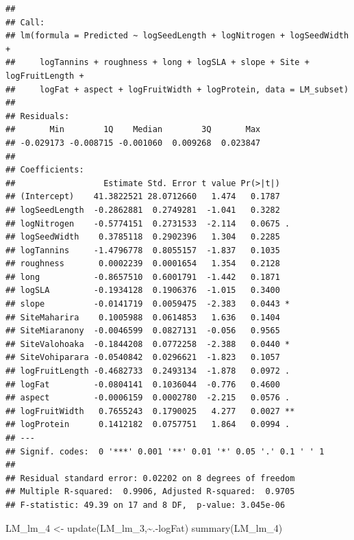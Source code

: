 \documentclass[
  12pt,
]{article}
\newenvironment{Shaded}{\begin{snugshade}}{\end{snugshade}}
\newcommand{\FunctionTok}[1]{\textcolor[rgb]{0.00,0.00,0.00}{#1}}
\newcommand{\NormalTok}[1]{#1}
\newcommand{\OtherTok}[1]{\textcolor[rgb]{0.56,0.35,0.01}{#1}}
\newcommand{\SpecialCharTok}[1]{\textcolor[rgb]{0.00,0.00,0.00}{#1}}
\begin{document}
\begin{verbatim}
## 
## Call:
## lm(formula = Predicted ~ logSeedLength + logNitrogen + logSeedWidth + 
##     logTannins + roughness + long + logSLA + slope + Site + logFruitLength + 
##     logFat + aspect + logFruitWidth + logProtein, data = LM_subset)
## 
## Residuals:
##       Min        1Q    Median        3Q       Max 
## -0.029173 -0.008715 -0.001060  0.009268  0.023847 
## 
## Coefficients:
##                  Estimate Std. Error t value Pr(>|t|)   
## (Intercept)    41.3822521 28.0712660   1.474   0.1787   
## logSeedLength  -0.2862881  0.2749281  -1.041   0.3282   
## logNitrogen    -0.5774151  0.2731533  -2.114   0.0675 . 
## logSeedWidth    0.3785118  0.2902396   1.304   0.2285   
## logTannins     -1.4796778  0.8055157  -1.837   0.1035   
## roughness       0.0002239  0.0001654   1.354   0.2128   
## long           -0.8657510  0.6001791  -1.442   0.1871   
## logSLA         -0.1934128  0.1906376  -1.015   0.3400   
## slope          -0.0141719  0.0059475  -2.383   0.0443 * 
## SiteMaharira    0.1005988  0.0614853   1.636   0.1404   
## SiteMiaranony  -0.0046599  0.0827131  -0.056   0.9565   
## SiteValohoaka  -0.1844208  0.0772258  -2.388   0.0440 * 
## SiteVohiparara -0.0540842  0.0296621  -1.823   0.1057   
## logFruitLength -0.4682733  0.2493134  -1.878   0.0972 . 
## logFat         -0.0804141  0.1036044  -0.776   0.4600   
## aspect         -0.0006159  0.0002780  -2.215   0.0576 . 
## logFruitWidth   0.7655243  0.1790025   4.277   0.0027 **
## logProtein      0.1412182  0.0757751   1.864   0.0994 . 
## ---
## Signif. codes:  0 '***' 0.001 '**' 0.01 '*' 0.05 '.' 0.1 ' ' 1
## 
## Residual standard error: 0.02202 on 8 degrees of freedom
## Multiple R-squared:  0.9906, Adjusted R-squared:  0.9705 
## F-statistic: 49.39 on 17 and 8 DF,  p-value: 3.045e-06
\end{verbatim}

\begin{Shaded}
\begin{Highlighting}[]
\NormalTok{LM\_lm\_4 }\OtherTok{\textless{}{-}} \FunctionTok{update}\NormalTok{(LM\_lm\_3,}\SpecialCharTok{\textasciitilde{}}\NormalTok{.}\SpecialCharTok{{-}}\NormalTok{logFat)}
\FunctionTok{summary}\NormalTok{(LM\_lm\_4)}
\end{Highlighting}
\end{Shaded}
\end{document}
